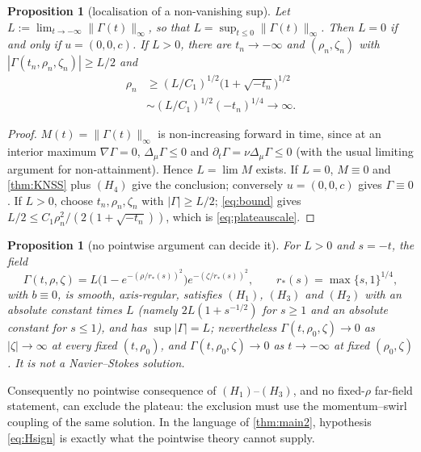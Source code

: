\documentclass[11pt]{article}
\newtheorem{proposition}[theorem]{Proposition}
\theoremstyle{definition}
\begin{document}
\begin{proposition}[localisation of a non-vanishing sup]\label{prop:plateau}
Let $L:=\lim_{t\to-\infty}\|\Gamma(t)\|_\infty$, so that
$L=\sup_{t\le0}\|\Gamma(t)\|_\infty$. Then $L=0$ if and only if $u=(0,0,c)$. If $L>0$, there are $t_n\to-\infty$
and $(\rho_n,\zeta_n)$ with $|\Gamma(t_n,\rho_n,\zeta_n)|\ge L/2$ and
\begin{equation}\label{eq:plateauscale}
\begin{split}
\rho_n&\ge(L/C_1)^{1/2}\bigl(1+\sqrt{-t_n}\bigr)^{1/2}\\
&\sim(L/C_1)^{1/2}(-t_n)^{1/4}\longrightarrow\infty .
\end{split}
\end{equation}
\end{proposition}
\begin{proof}
$M(t)=\|\Gamma(t)\|_\infty$ is non-increasing forward in time, since at an
interior maximum $\nabla\Gamma=0$, $\Delta_\mu\Gamma\le0$ and
$\partial_t\Gamma=\nu\Delta_\mu\Gamma\le0$ (with the usual limiting argument
for non-attainment). Hence $L=\lim M$ exists. If $L=0$, $M\equiv0$ and
\cref{thm:KNSS} plus $(H_4)$ give the conclusion; conversely $u=(0,0,c)$
gives $\Gamma\equiv0$. If $L>0$, choose $t_n,\rho_n,\zeta_n$ with
$|\Gamma|\ge L/2$; \eqref{eq:bound} gives
$L/2\le C_1\rho_n^2/(2(1+\sqrt{-t_n}))$, which is \eqref{eq:plateauscale}.
\end{proof}

\begin{proposition}[no pointwise argument can decide it]\label{prop:witness}
For $L>0$ and $s=-t$, the field
\begin{equation}\label{eq:witness}
\Gamma(t,\rho,\zeta)
=L\bigl(1-e^{-(\rho/r_*(s))^2}\bigr)e^{-(\zeta/r_*(s))^2},
\qquad r_*(s)=\max\{s,1\}^{1/4},
\end{equation}
with $b\equiv0$, is smooth, axis-regular, satisfies $(H_1)$, $(H_3)$ and
$(H_2)$ with an absolute constant times $L$ (namely $2L(1+s^{-1/2})$ for
$s\ge1$ and an absolute constant for $s\le1$), and has
$\sup|\Gamma|=L$; nevertheless $\Gamma(t,\rho_0,\zeta)\to0$ as
$|\zeta|\to\infty$ at every fixed $(t,\rho_0)$, and $\Gamma(t,\rho_0,\zeta)\to0$
as $t\to-\infty$ at fixed $(\rho_0,\zeta)$. It is not a Navier--Stokes
solution.
\end{proposition}

Consequently no pointwise consequence of $(H_1)$--$(H_3)$, and no
fixed-$\rho$ far-field statement, can exclude the plateau: the exclusion must
use the momentum--swirl coupling of the same solution. In the language of
\cref{thm:main2}, hypothesis \eqref{eq:Hsign} is exactly what the pointwise
theory cannot supply.
\end{document}
